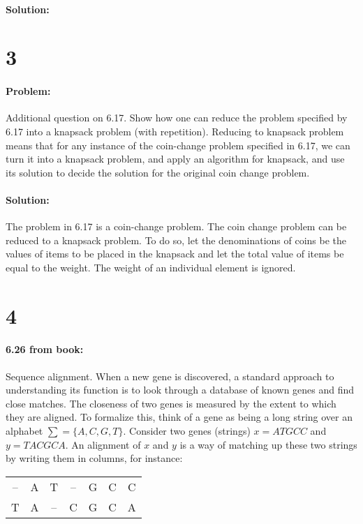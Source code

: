 \documentclass[12pt]{article}
\begin{document}
\paragraph{Solution:}


\section*{3}
\paragraph{Problem:}
Additional question on 6.17. Show how one can reduce the problem specified by
6.17 into a knapsack problem (with repetition). Reducing to knapsack problem
means that for any instance of the coin-change problem specified in 6.17, we
can turn it into a knapsack problem, and apply an algorithm for knapsack, and
use its solution to decide the solution for the original coin change problem.
\paragraph{Solution:}

The problem in 6.17 is a coin-change problem. The coin change problem
can be reduced to a knapsack problem. To do so, let the denominations of
coins be the values of items to be placed in the knapsack and let the
total value of items be equal to the weight. The weight of an individual
element is ignored.

\section*{4}
\paragraph{6.26 from book:}
Sequence alignment. When a new gene is discovered, a standard approach to
understanding its function is to look through a database of known genes and
find close matches. The closeness of two genes is measured by the extent to 
which they are aligned. To formalize this, think of a gene as being a long
string over an alphabet $\sum = \{A, C, G, T\}$. Consider two genes (strings)
$x = AT GCC$ and $y = T ACGCA$. An alignment of $x$ and $y$ is a way of matching up
these two strings by writing them in columns, for instance:

\begin{center}
\begin{tabular}{c c c c c c c}
-- &A &T &-- &G &C &C \\
T &A &-- &C &G &C &A
\end{tabular}
\end{center}
\end{document}
